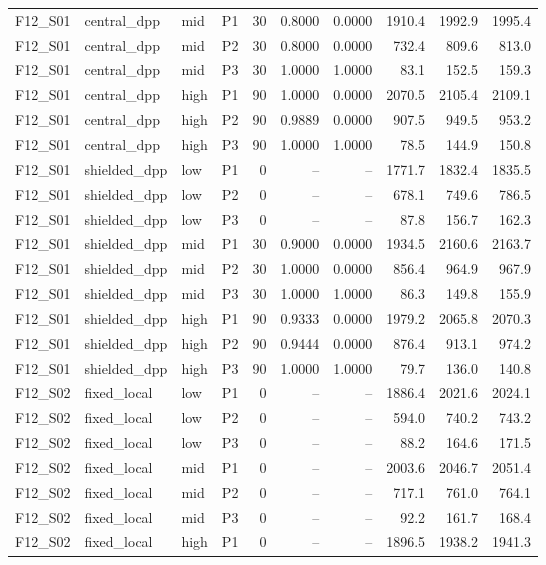 \begin{longtable}{llllrrrrrr}
F12\_S01 & central\_dpp & mid & P1 & 30 & 0.8000 & 0.0000 & 1910.4 & 1992.9 & 1995.4 \\
F12\_S01 & central\_dpp & mid & P2 & 30 & 0.8000 & 0.0000 & 732.4 & 809.6 & 813.0 \\
F12\_S01 & central\_dpp & mid & P3 & 30 & 1.0000 & 1.0000 & 83.1 & 152.5 & 159.3 \\
F12\_S01 & central\_dpp & high & P1 & 90 & 1.0000 & 0.0000 & 2070.5 & 2105.4 & 2109.1 \\
F12\_S01 & central\_dpp & high & P2 & 90 & 0.9889 & 0.0000 & 907.5 & 949.5 & 953.2 \\
F12\_S01 & central\_dpp & high & P3 & 90 & 1.0000 & 1.0000 & 78.5 & 144.9 & 150.8 \\
F12\_S01 & shielded\_dpp & low & P1 & 0 & -- & -- & 1771.7 & 1832.4 & 1835.5 \\
F12\_S01 & shielded\_dpp & low & P2 & 0 & -- & -- & 678.1 & 749.6 & 786.5 \\
F12\_S01 & shielded\_dpp & low & P3 & 0 & -- & -- & 87.8 & 156.7 & 162.3 \\
F12\_S01 & shielded\_dpp & mid & P1 & 30 & 0.9000 & 0.0000 & 1934.5 & 2160.6 & 2163.7 \\
F12\_S01 & shielded\_dpp & mid & P2 & 30 & 1.0000 & 0.0000 & 856.4 & 964.9 & 967.9 \\
F12\_S01 & shielded\_dpp & mid & P3 & 30 & 1.0000 & 1.0000 & 86.3 & 149.8 & 155.9 \\
F12\_S01 & shielded\_dpp & high & P1 & 90 & 0.9333 & 0.0000 & 1979.2 & 2065.8 & 2070.3 \\
F12\_S01 & shielded\_dpp & high & P2 & 90 & 0.9444 & 0.0000 & 876.4 & 913.1 & 974.2 \\
F12\_S01 & shielded\_dpp & high & P3 & 90 & 1.0000 & 1.0000 & 79.7 & 136.0 & 140.8 \\
F12\_S02 & fixed\_local & low & P1 & 0 & -- & -- & 1886.4 & 2021.6 & 2024.1 \\
F12\_S02 & fixed\_local & low & P2 & 0 & -- & -- & 594.0 & 740.2 & 743.2 \\
F12\_S02 & fixed\_local & low & P3 & 0 & -- & -- & 88.2 & 164.6 & 171.5 \\
F12\_S02 & fixed\_local & mid & P1 & 0 & -- & -- & 2003.6 & 2046.7 & 2051.4 \\
F12\_S02 & fixed\_local & mid & P2 & 0 & -- & -- & 717.1 & 761.0 & 764.1 \\
F12\_S02 & fixed\_local & mid & P3 & 0 & -- & -- & 92.2 & 161.7 & 168.4 \\
F12\_S02 & fixed\_local & high & P1 & 0 & -- & -- & 1896.5 & 1938.2 & 1941.3 \\

\end{longtable}
